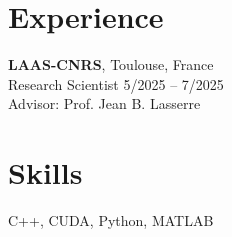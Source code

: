 
    \section{\mysidestyle Experience}

    \textbf{LAAS-CNRS}, Toulouse, France \vspace{1mm}\\\vspace{1mm}%
    {Research Scientist} \hfill 5/2025 -- 7/2025 \\
    Advisor: Prof. Jean B. Lasserre

    \section{\mysidestyle Skills}

    C++, CUDA, Python, MATLAB



    